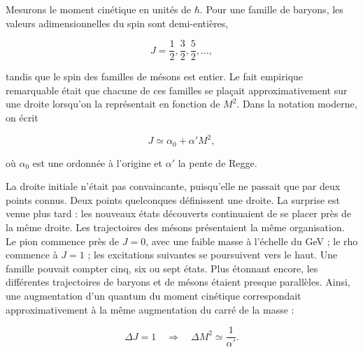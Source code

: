 Mesurons le moment cinétique en unités de \(\hbar\). Pour une famille de baryons, les valeurs adimensionnelles du spin sont demi-entières,

\begin{equation}
  J=\frac12,\frac32,\frac52,\ldots,
\end{equation}

tandis que le spin des familles de mésons est entier. Le fait empirique remarquable était que chacune de ces familles se plaçait approximativement sur une droite lorsqu’on la représentait en fonction de \(M^2\). Dans la notation moderne, on écrit

\begin{equation}
  J\simeq \alpha_0+\alpha' M^2,
  \label{eq:l01-regge-trajectory}
\end{equation}

où \(\alpha_0\) est une ordonnée à l’origine et \(\alpha'\) la pente de Regge.

La droite initiale n’était pas convaincante, puisqu’elle ne passait que par deux points connus. Deux points quelconques définissent une droite. La surprise est venue plus tard : les nouveaux états découverts continuaient de se placer près de la même droite. Les trajectoires des mésons présentaient la même organisation. Le pion commence près de \(J=0\), avec une faible masse à l’échelle du GeV ; le rho commence à \(J=1\) ; les excitations suivantes se poursuivent vers le haut. Une famille pouvait compter cinq, six ou sept états. Plus étonnant encore, les différentes trajectoires de baryons et de mésons étaient presque parallèles. Ainsi, une augmentation d’un quantum du moment cinétique correspondait approximativement à la même augmentation du carré de la masse :

\begin{equation}
  \Delta J=1
  \quad\Longrightarrow\quad
  \Delta M^2\simeq \frac{1}{\alpha'}.
  \label{eq:l01-regge-spacing}
\end{equation}

\begin{classroomqa}
\end{classroomqa}

